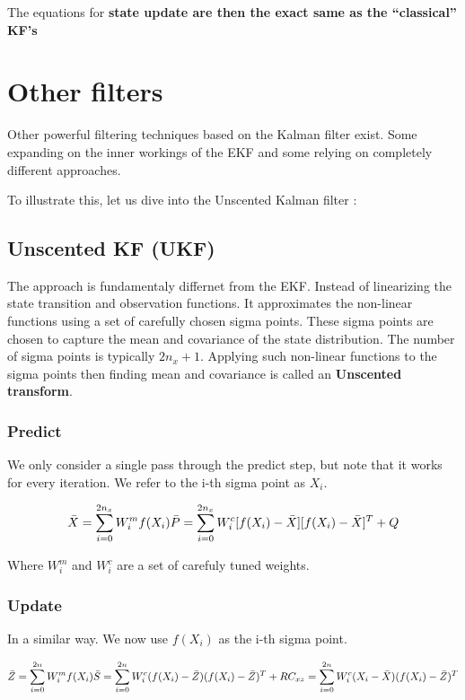 \documentclass[12pt]{article}
\begin{document}
The equations for \textbf{state update are then the exact same as the
``classical'' KF's}

\section{Other filters}\label{other-filters}

Other powerful filtering techniques based on the Kalman filter exist.
Some expanding on the inner workings of the EKF and some relying on
completely different approaches.

To illustrate this, let us dive into the Unscented Kalman filter :

\subsection{Unscented KF (UKF)}\label{unscented-kf-ukf}

The approach is fundamentaly differnet from the EKF. Instead of
linearizing the state transition and observation functions. It
approximates the non-linear functions using a set of carefully chosen
sigma points. These sigma points are chosen to capture the mean and
covariance of the state distribution. The number of sigma points is
typically \(2n_x+1\). Applying such non-linear functions to the sigma
points then finding mean and covariance is called an \textbf{Unscented
transform}.

\subsubsection{Predict}\label{predict}

We only consider a single pass through the predict step, but note that
it works for every iteration. We refer to the i-th sigma point as
\(X_i\).

\[
\bar{X} = \sum_{i=0}^{2n_x} W_{i}^{m} f(X_{i})\\
\bar{P} = \sum_{i=0}^{2n_x} W_{i}^{c} [f(X_{i}) - \bar{X}][f(X_{i}) - \bar{X}]^{T} + Q \]

Where \(W_{i}^{m}\) and \(W_{i}^{c}\) are a set of carefuly tuned
weights.

\subsubsection{Update}\label{update-1}

In a similar way. We now use \(f(X_{i})\) as the i-th sigma point.

\[
\bar{Z} = \sum_{i=0}^{2n} W_{i}^{m} f(X_{i})\\
\bar{S} = \sum_{i=0}^{2n} W_{i}^{c}  (f(X_{i}) - \bar{Z}) (f(X_{i}) - \bar{Z})^{T} + R\\
C_{xz} = \sum_{i=0}^{2n} W_{i}^{c}  (X_{i} - \bar{X}) (f(X_{i}) - \bar{Z})^{T}\]
\end{document}

